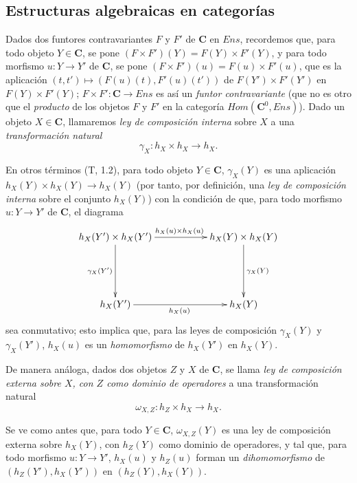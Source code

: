 \subsection{Estructuras algebraicas en categorías}
\label{subsection:0.8.2}
\label{subsection:0.8.2-fr}

\begin{env}[8.2.1]
\label{0.8.2.1}
\label{0.8.2.1-fr}
Dados dos funtores contravariantes $F$ y $F'$ de $\boldsymbol{C}$ en $\boldsymbol{\mathit{Ens}}$, recordemos que, para todo objeto $Y\in\boldsymbol{C}$, se pone $(F\times F')(Y)=F(Y)\times F'(Y)$, y para todo morfismo $u:Y\to Y'$ de $\boldsymbol{C}$, se pone $(F\times F')(u)=F(u)\times F'(u)$, que es la aplicación $(t,t')\mapsto(F(u)(t),F'(u)(t'))$ de $F(Y')\times F'(Y')$ en $F(Y)\times F'(Y)$; $F\times F':\boldsymbol{C}\to\boldsymbol{\mathit{Ens}}$ es así un \emph{funtor contravariante} (que no es otro que el \emph{producto} de los objetos $F$ y $F'$ en la categoría $\boldsymbol{\mathit{Hom}}(\boldsymbol{C}^0,\boldsymbol{\mathit{Ens}})$).
Dado un objeto $X\in\boldsymbol{C}$, llamaremos \emph{ley de composición interna} sobre $X$ a una \emph{transformación natural}
\[
  \gamma_X:h_X\times h_X\to h_X.
  \tag{8.2.1.1}
\]

En otros términos (T, 1.2), para todo objeto $Y\in\boldsymbol{C}$, $\gamma_X(Y)$ es una aplicación $h_X(Y)\times h_X(Y)\to h_X(Y)$ (por tanto, por definición, una \emph{ley de composición interna} sobre el conjunto $h_X(Y)$) con la condición de que, para todo morfismo $u:Y\to Y'$ de $\boldsymbol{C}$, el diagrama
\[
  \xymatrix{
    h_X(Y')\times h_X(Y')
      \ar[rr]^{h_X(u)\times h_X(u)}\ar[dd]_{\gamma_X(Y')} &&
    h_X(Y)\times h_X(Y)\ar[dd]^{\gamma_X(Y)}\\\\
    h_X(Y')\ar[rr]_{h_X(u)} && h_X(Y)
  }
\]
sea conmutativo; esto implica que, para las leyes de composición $\gamma_X(Y)$ y $\gamma_X(Y')$, $h_X(u)$ es un \emph{homomorfismo} de $h_X(Y')$ en $h_X(Y)$.

De manera análoga, dados dos objetos $Z$ y $X$ de $\boldsymbol{C}$, se llama \emph{ley de composición externa sobre $X$, con $Z$ como dominio de operadores} a una transformación natural
\[
  \omega_{X,Z}:h_Z\times h_X\to h_X.
  \tag{8.2.1.2}
\]

Se ve como antes que, para todo $Y\in\boldsymbol{C}$, $\omega_{X,Z}(Y)$ es una ley de composición externa sobre $h_X(Y)$, con $h_Z(Y)$ como dominio de operadores, y tal que, para todo morfismo $u:Y\to Y'$, $h_X(u)$ y $h_Z(u)$ forman un \emph{dihomomorfismo} de $(h_Z(Y'),h_X(Y'))$ en $(h_Z(Y),h_X(Y))$.
\end{env}

